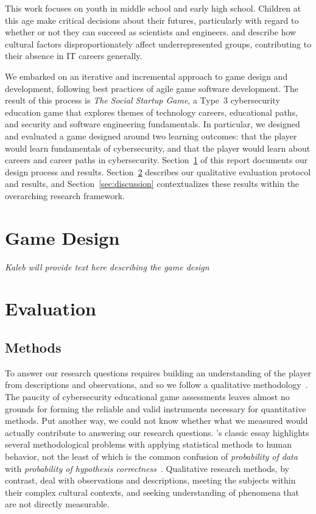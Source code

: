 \documentclass[letterpaper]{article}
\begin{document}
This work focuses on youth in middle school and early high school. Children at
this age make critical decisions about their futures, particularly with regard
to whether or not they can succeed as scientists 
and engineers. \citet{Margolis2003} and \citet{Margolis2010} describe
how cultural factors disproportionately affect underrepresented groups,
contributing to their absence in IT careers generally.

We embarked on an iterative and incremental
approach to game design and development, following best practices
of agile game software development.
The result of this process is \textit{The Social Startup Game}, 
a Type~3 cybersecurity education game that explores themes of
technology careers, educational paths, and security and
software engineering fundamentals.
In particular, we designed and evaluated a game designed around
two learning outcomes: that the player would learn fundamentals of
cybersecurity, and that the player would learn about careers and
career paths in cybersecurity.
Section~\ref{sec:design} of this report documents our design process
and results. Section~\ref{sec:evaluation} describes our
qualitative evaluation protocol and results, and Section~\ref{sec:discussion}
contextualizes these results within the overarching research framework.


\section{Game Design}
\label{sec:design}

\textit{Kaleb will provide text here describing the game design}

\section{Evaluation}
\label{sec:evaluation}

\subsection{Methods}

To answer our research questions requires building an understanding of
the player from descriptions and observations, and so we follow a
qualitative methodology~\citep[see][for example]{Stake2010}.  The
paucity of cybersecurity educational game assessments leaves almost no
grounds for forming the reliable and valid instruments necessary for
quantitative methods. Put another way, we could not know whether what
we measured would actually contribute to answering our research
questions.  \citeauthor{Cohen1994}'s classic essay highlights several
methodological problems with applying statistical methods to human
behavior, not the least of which is the common confusion of
\textit{probability of data} with \textit{probability of hypothesis
  correctness}~\citep{Cohen1994}.
Qualitative research methods, by contrast, deal with 
observations and descriptions, meeting the subjects within their
complex cultural contexts, and seeking understanding of phenomena
that are not directly measurable. 
\end{document}
